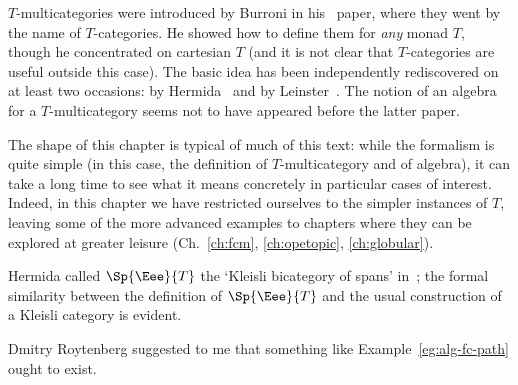 \begin{notes}

$T$-multicategories were introduced by Burroni%
%
%
in his~\cite{Bur} paper,
where they went by the name of $T$-categories.  He showed how to define
them for \emph{any} monad $T$, though he concentrated on cartesian $T$ (and
it is not clear that $T$-categories are useful outside this case).  The
basic idea has been independently rediscovered on at least two occasions:
by Hermida~\cite{HerRM}%
%
%
and by Leinster~\cite{GOM}.  The notion of an
algebra for a $T$-multicategory seems not to have appeared before the
latter paper.

The shape of this chapter is typical of much of this text: while the
formalism is quite simple (in this case, the definition of
$T$-multicategory and of algebra), it can take a long time to see what it
means concretely in particular cases of interest.  Indeed, in this chapter
we have restricted ourselves to the simpler instances of $T$, leaving some
of the more advanced examples to chapters where they can be explored at
greater leisure (Ch.~\ref{ch:fcm}, \ref{ch:opetopic}, \ref{ch:globular}).

Hermida called $\Sp{\Eee}{T}$ the `Kleisli%
%
%
bicategory of spans'
in~\cite{HerRM}; the formal similarity between the definition of
$\Sp{\Eee}{T}$ and the usual construction of a Kleisli category is evident.

Dmitry Roytenberg%
%
%
suggested to me that something like
Example~\ref{eg:alg-fc-path} ought to exist.



\end{notes}
